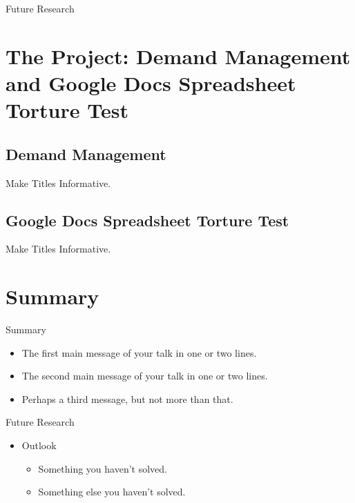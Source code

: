 \documentclass{beamer}
\begin{document}
\begin{frame}{Future Research}
  
\end{frame}

\section[Research Project]{The Project: Demand Management and Google Docs Spreadsheet Torture Test}

\subsection{Demand Management}

\begin{frame}{Make Titles Informative.}
\end{frame}

\subsection[GDocs Spreadsheet Testing]{Google Docs Spreadsheet Torture Test}

\begin{frame}{Make Titles Informative.}
\end{frame}

\section*{Summary}

\begin{frame}{Summary}

\begin{itemize}
  \item The \alert{first main message} of your talk in one or two lines.
  \item The \alert{second main message} of your talk in one or two lines.
  \item Perhaps a \alert{third message}, but not more than that.
\end{itemize}

\end{frame}

\begin{frame}{Future Research}
\begin{itemize}
  \item Outlook
  \begin{itemize}
    \item Something you haven't solved.
    \item Something else you haven't solved.
  \end{itemize}
  \end{itemize}
\end{frame}
\end{document}
